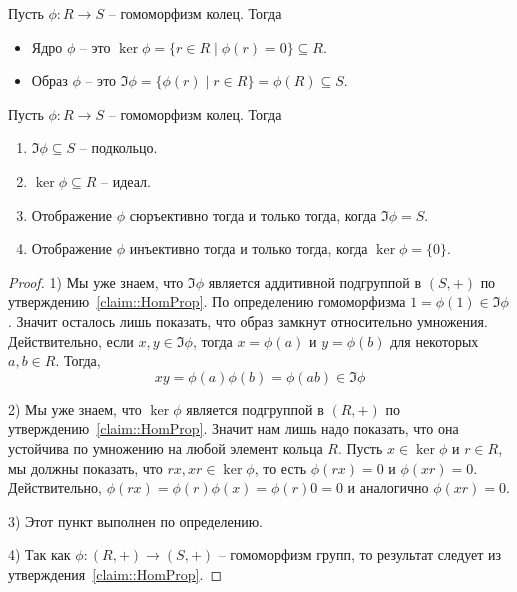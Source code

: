 \begin{definition}
Пусть $\phi\colon R\to S$ -- гомоморфизм колец.
Тогда
\begin{itemize}
\item Ядро $\phi$ -- это $\ker\phi = \{r\in R\mid \phi(r) = 0\}\subseteq R$.

\item Образ $\phi$ -- это $\Im \phi = \{\phi(r) \mid r\in R\} = \phi(R)\subseteq S$.
\end{itemize}
\end{definition}

\begin{claim}
\label{claim::RingHomProp}
Пусть $\phi\colon R\to S$ -- гомоморфизм колец.
Тогда
\begin{enumerate}
\item $\Im\phi\subseteq S$ -- подкольцо.

\item $\ker \phi\subseteq R$ -- идеал.

\item Отображение $\phi$ сюръективно тогда и только тогда, когда $\Im\phi = S$.

\item Отображение $\phi$ инъективно тогда и только тогда, когда $\ker \phi = \{0\}$.
\end{enumerate}
\end{claim}
\begin{proof}
1) Мы уже знаем, что $\Im \phi$ является аддитивной подгруппой в $(S, + )$ по утверждению~\ref{claim::HomProp}.
По определению гомоморфизма $1 = \phi(1) \in \Im \phi$.
Значит осталось лишь показать, что образ замкнут относительно умножения.
Действительно, если $x,y\in \Im\phi$, тогда $x = \phi(a)$ и $y = \phi(b)$ для некоторых $a,b\in R$.
Тогда,
\[
xy = \phi(a) \phi(b) = \phi(ab) \in \Im \phi
\]

2) Мы уже знаем, что $\ker \phi$ является подгруппой в $(R, +)$ по утверждению~\ref{claim::HomProp}.
Значит нам лишь надо показать, что она устойчива по умножению на любой элемент кольца $R$.
Пусть $x\in \ker \phi$ и $r\in R$, мы должны показать, что  $rx, xr \in \ker \phi$, то есть $\phi(rx) = 0$ и $\phi(xr) = 0$.
Действительно, $\phi(rx) = \phi(r)\phi(x) = \phi(r) 0 = 0$ и аналогично $\phi(xr) = 0$.

3) Этот пункт выполнен по определению.

4) Так как $\phi\colon (R,+)\to (S,+)$ -- гомоморфизм групп, то результат следует из утверждения~\ref{claim::HomProp}.
\end{proof}

